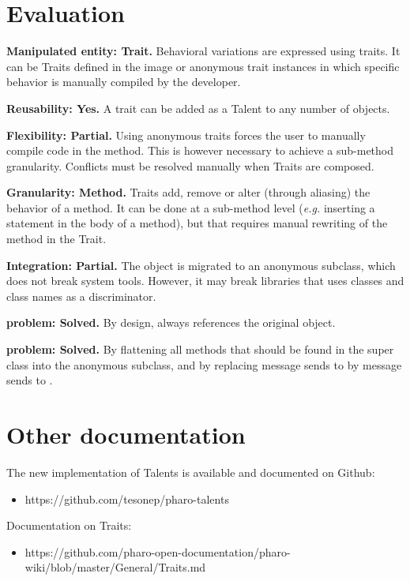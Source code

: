 \documentclass[10pt,twoside,english]{_support/latex/sbabook/sbabook}
\begin{document}
\section{Evaluation}
\textbf{Manipulated entity: Trait.} Behavioral variations are expressed using traits. It can be Traits defined in the image or anonymous trait instances in which specific behavior is manually compiled by the developer.

\textbf{Reusability: Yes.} A trait can be added as a Talent to any number of objects.

\textbf{Flexibility: Partial.} Using anonymous traits forces the user to manually compile code in the method. This is however necessary to achieve a sub-method granularity. Conflicts must be resolved manually when Traits are composed.

\textbf{Granularity: Method.} Traits add, remove or alter (through aliasing) the behavior of a method. It can be done at a sub-method level (\textit{e.g.} inserting a statement in the body of a method), but that requires manual rewriting of the method in the Trait.

\textbf{Integration: Partial.} The object is migrated to an anonymous subclass, which does not break system tools. However, it may break libraries that uses classes and class names as a discriminator.

\textbf{ problem: Solved.} By design,  always references the original object.

\textbf{ problem: Solved.} By flattening all methods that should be found in the super class into the anonymous subclass, and by replacing message sends to  by message sends to .
\section{Other documentation}
The new implementation of Talents is available and documented on Github:

\begin{itemize}
\item https://github.com/tesonep/pharo-talents
\end{itemize}

Documentation on Traits:

\begin{itemize}
\item https://github.com/pharo-open-documentation/pharo-wiki/blob/master/General/Traits.md
\end{itemize}
\end{document}
